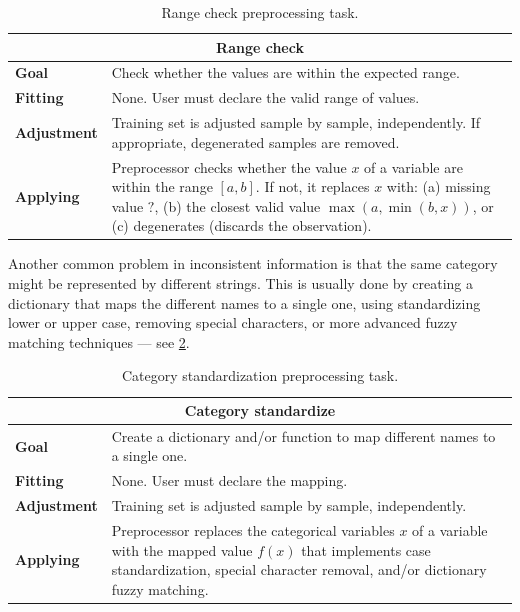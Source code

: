 \begin{table}\caption{Range check preprocessing task.}
  \centering
  \begin{tabular}{lp{6cm}}
    \toprule
    \multicolumn{2}{c}{\textbf{Range check}} \\
    \midrule
    \textbf{Goal} &
      Check whether the values are within the expected range. \\
    \textbf{Fitting} &
      None. User must declare the valid range of values. \\
    \textbf{Adjustment} &
      Training set is adjusted sample by sample, independently.  If appropriate,
      degenerated samples are removed. \\
    \textbf{Applying} &
      Preprocessor checks whether the value $x$ of a variable are within the range $[a,
      b]$.  If not, it replaces $x$ with: (a) missing value $?$, (b) the closest valid
      value $\max(a, \min(b, x))$, or (c) degenerates (discards the observation). \\
    \bottomrule
  \end{tabular}
  \label{tab:range-check}
\end{table}

Another common problem in inconsistent information is that the same category might be
represented by different strings.  This is usually done by creating a dictionary that maps
the different names to a single one, using standardizing lower or upper case, removing
special characters, or more advanced fuzzy matching techniques --- see
\cref{tab:text-standardization}.

\begin{table}\caption{Category standardization preprocessing task.}
  \centering
  \begin{tabular}{lp{6cm}}
    \toprule
    \multicolumn{2}{c}{\textbf{Category standardize}} \\
    \midrule
    \textbf{Goal} &
      Create a dictionary and/or function to map different names to a single one. \\
    \textbf{Fitting} &
      None. User must declare the mapping. \\
    \textbf{Adjustment} &
      Training set is adjusted sample by sample, independently. \\
    \textbf{Applying} &
      Preprocessor replaces the categorical variables $x$ of a variable with the mapped
      value $f(x)$ that implements case standardization, special character removal, and/or
      dictionary fuzzy matching. \\
    \bottomrule
  \end{tabular}
  \label{tab:text-standardization}
\end{table}

